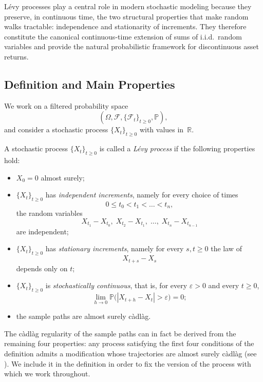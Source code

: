 L\'evy processes play a central role in modern stochastic modeling because they preserve, in continuous time, the two structural properties that make random walks tractable: independence and stationarity of increments. They therefore constitute the canonical continuous-time extension of sums of i.i.d.\ random variables and provide the natural probabilistic framework for discontinuous asset returns.
\subsection{Definition and Main Properties}

We work on a filtered probability space
\[
(\Omega,\mathcal{F},\{\mathcal{F}_t\}_{t\geq 0},\mathbb{P}),
\]
and consider a stochastic process $\{X_t\}_{t\geq 0}$ with values in~$\mathbb{R}$.

\begin{definition}
A stochastic process $\{X_t\}_{t\geq 0}$ is called a \emph{L\'evy process} if the following properties hold:
\begin{itemize}[label = --]
    \item $X_0 = 0$ almost surely;
    \item $\{X_t\}_{t\geq 0}$ has \emph{independent increments}, namely for every choice of times
    \[
    0 \leq t_0 < t_1 < \dots < t_n,
    \]
    the random variables
    \[
    X_{t_1}-X_{t_0},\; X_{t_2}-X_{t_1},\; \dots,\; X_{t_n}-X_{t_{n-1}}
    \]
    are independent;
    \item $\{X_t\}_{t\geq 0}$ has \emph{stationary increments}, namely for every $s,t \geq 0$ the law of
    \[
    X_{t+s}-X_s
    \]
    depends only on $t$;
    \item $\{X_t\}_{t\geq 0}$ is \emph{stochastically continuous}, that is, for every $\varepsilon > 0$ and every $t \geq 0$,
    \[
    \lim_{h\to 0}\mathbb{P}\bigl(|X_{t+h}-X_t|>\varepsilon\bigr)=0;
    \]
    \item the sample paths are almost surely c\`adl\`ag.
\end{itemize}
\end{definition}

\begin{remark}
The c\`adl\`ag regularity of the sample paths can in fact be derived from the remaining four properties: any process satisfying the first four conditions of the definition admits a modification whose trajectories are almost surely c\`adl\`ag (see \cite[Theorem~11.5]{Sato1999}). We include it in the definition in order to fix the version of the process with which we work throughout.
\end{remark}

